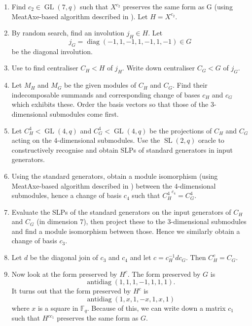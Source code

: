 \documentclass[twoside,a4paper,reqno,psamsfonts]{amsart}
\numberwithin{equation}{section}
\numberwithin{figure}{section}
\newcounter{algorithm}
\theoremstyle{plain}
\theoremstyle{definition}
\theoremstyle{remark}
\newcommand{\field}[1]{\mathbb{#1}}
\newcommand{\F}{\field{F}}
\DeclareMathOperator{\GL}{GL}
\DeclareMathOperator{\SL}{SL}
\DeclareMathOperator{\diag}{diag}
\DeclareMathOperator{\antidiag}{antidiag}
\begin{document}
\begin{enumerate}
\item Find $c_2 \in \GL(7, q)$ such that $X^{c_2}$ preserves the same form as G (using MeatAxe-based algorithm described in \cite{hcgt}). Let $H = X^{c_2}$.
\item By random search, find an involution $j_H \in H$. Let \[ j_G = \diag(-1, 1, -1, 1, -1, 1, -1) \in G \] be the diagonal involution.
\item Use \cite{bray00} to find centraliser $C_H < H$ of $j_H$. Write down centraliser $C_G < G$ of $j_G$.
\item Let $M_H$ and $M_G$ be the given modules of $C_H$ and $C_G$. Find their indecomposable summands and corresponding change of bases $c_H$ and $c_G$ which exhibits these. Order the basis vectors so that those of the $3$-dimensional submodules come first.
\item Let $C_H^4 < \GL(4, q)$ and $C_G^4 < \GL(4, q)$ be the projections of $C_H$ and $C_G$ acting on the $4$-dimensional submodules. Use the $\SL(2, q)$ oracle to constructively recognise and obtain SLPs of standard generators in input generators.
\item Using the standard generators, obtain a module isomorphism (using MeatAxe-based algorithm described in \cite{hcgt}) between the $4$-dimensional submodules, hence a change of basis $c_4$ such that ${C_H^4}^{c_4} = C_G^4$.
\item Evaluate the SLPs of the standard generators on the input generators of $C_H$ and $C_G$ (in dimension $7$), then project these to the $3$-dimensional submodules and find a module isomorphism between those. Hence we similarly obtain a change of basis $c_3$.
\item Let $d$ be the diagonal join of $c_3$ and $c_4$ and let $c = c_H^{-1} d c_G$. Then $C_H^c = C_G$.
\item Now look at the form preserved by $H^c$. The form preserved by $G$ is
\[\antidiag(1,1,1,-1,1,1,1).\] It turns out that the form preserved by $H^c$ is
\[\antidiag(1,x,1,-x,1,x,1)\] where $x$ is a square in $\F_q$.
Because of this, we can write down a matrix $c_1$ such that $H^{c c_1}$ preserves the same form as $G$.


\end{enumerate}
\end{document}
